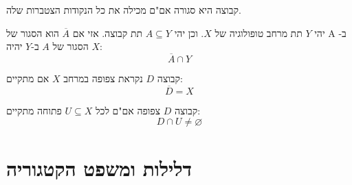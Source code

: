 \documentclass{tstextbook}
\begin{document}
\begin{corollary}
קבוצה היא סגורה אם"ם מכילה את כל הנקודות הצטברות שלה.

\end{corollary}
\begin{proposition}
יהי \(Y\) תת מרחב טופולוגיה של \(X\). וכן יהי \(A\subseteq Y\) תת קבוצה. אזי אם \(\overline{A}\) הוא הסגור של A ב-\(X\) הסגור של \(A\) ב-\(Y\) יהיה:
$$\overline{A} \cap  Y$$

\end{proposition}
\begin{definition}
קבוצה \(D\) נקראת צפופה במרחב \(X\) אם מתקיים:
$$\overline{D} =X$$

\end{definition}
\begin{proposition}
קבוצה \(D\) צפופה אם"ם לכל \(U\subseteq X\) פתוחה מתקיים:
$$D\cap U\neq \varnothing $$

\end{proposition}
\section{דלילות ומשפט הקטגוריה}
\end{document}
